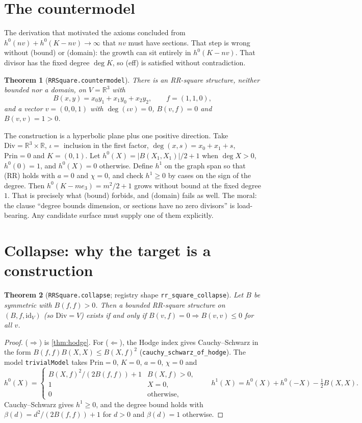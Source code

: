 \documentclass[11pt]{article}
\newtheorem{theorem}{Theorem}
\theoremstyle{definition}
\newcommand{\lean}[1]{\texttt{#1}}
\newcommand{\R}{\mathbb{R}}
\newcommand{\Div}{\mathrm{Div}}
\newcommand{\Prin}{\mathrm{Prin}}
\begin{document}
\section{The countermodel}\label{sec:counter}

The derivation that motivated the axioms concluded from $h^0(nv) + h^0(K-nv) \to \infty$ that $nv$ must have sections. That step is wrong without (bound) or (domain): the growth can sit entirely in $h^0(K - nv)$. That divisor has the fixed degree $\deg K$, so (eff) is satisfied without contradiction.

\begin{theorem}[\lean{RRSquare.countermodel}]
There is an RR-square structure, neither bounded nor a domain, on $V = \R^3$ with
\[
B(x,y) = x_0y_1 + x_1y_0 + x_2y_2, \qquad f = (1,1,0),
\]
and a vector $v = (0,0,1)$ with $\deg(\iota v) = 0$, $B(v,f) = 0$ and $B(v,v) = 1 > 0$.
\end{theorem}

The construction is a hyperbolic plane plus one positive direction. Take $\Div = \R^3\times\R$, $\iota = $ inclusion in the first factor, $\deg(x, s) = x_0 + x_1 + s$, $\Prin = 0$ and $K = (0,1)$. Let $h^0(X) = |B(X_1,X_1)|/2 + 1$ when $\deg X > 0$, $h^0(0) = 1$, and $h^0(X) = 0$ otherwise. Define $h^1$ on the graph span so that (RR) holds with $a = 0$ and $\chi = 0$, and check $h^1 \ge 0$ by cases on the sign of the degree. Then $h^0(K - m e_3) = m^2/2 + 1$ grows without bound at the fixed degree $1$. That is precisely what (bound) forbids, and (domain) fails as well. The moral: the clause ``degree bounds dimension, or sections have no zero divisors'' is load-bearing. Any candidate surface must supply one of them explicitly.

\section{Collapse: why the target is a construction}\label{sec:collapse}

\begin{theorem}[\lean{RRSquare.collapse}; registry shape \lean{rr\_square\_collapse}]\label{thm:collapse}
Let $B$ be symmetric with $B(f,f) > 0$. Then a bounded RR-square structure on $(B, f, \mathrm{id}_V)$ (so $\Div = V$) exists if and only if $B(v,f) = 0 \Rightarrow B(v,v)\le 0$ for all $v$.
\end{theorem}

\begin{proof}
($\Rightarrow$) is \cref{thm:hodge}. For ($\Leftarrow$), the Hodge index gives Cauchy--Schwarz in the form $B(f,f)B(X,X) \le B(X,f)^2$ (\lean{cauchy\_schwarz\_of\_hodge}). The model \lean{trivialModel} takes $\Prin = 0$, $K = 0$, $a = 0$, $\chi = 0$ and
\[
h^0(X) = \begin{cases} B(X,f)^2/(2B(f,f)) + 1 & B(X,f) > 0,\\ 1 & X = 0,\\ 0 & \text{otherwise,}\end{cases}
\qquad h^1(X) = h^0(X) + h^0(-X) - \tfrac12 B(X,X).
\]
Cauchy--Schwarz gives $h^1 \ge 0$, and the degree bound holds with $\beta(d) = d^2/(2B(f,f)) + 1$ for $d > 0$ and $\beta(d) = 1$ otherwise.
\end{proof}
\end{document}
